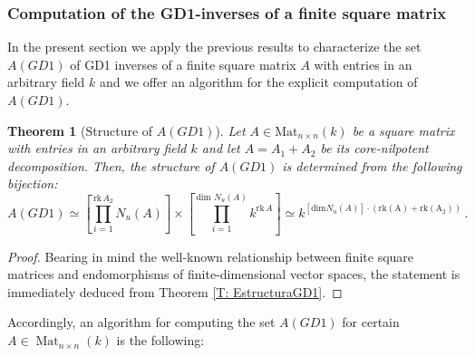 \documentclass[10pt,a4paper]{amsart}
\newtheorem{thm}[defn]{Theorem}
\theoremstyle{plain}
\theoremstyle{remark}
\numberwithin{equation}{section} \numberwithin{defn}{section}
\newcommand{\Mat}{\operatorname{Mat}}
\begin{document}
\subsubsection{Computation of the GD1-inverses of a finite square matrix}\label{ss: Computation GD1 Matrices}



In the present section we apply the previous results to characterize the set $A(GD1)$ of GD1 inverses of a finite square matrix $A$ with entries in an arbitrary field $k$ and we offer an algorithm for the explicit computation of $A(GD1).$ 

\begin{thm} [Structure of $A(GD1)$] \label{T: Char AGD1 fin} Let $A \in \text{Mat}_{n\times n} (k)$ be a square matrix with entries in an arbitrary field $k$ and let $A = A_1 + A_2$ be its core-nilpotent decomposition. Then, the structure of $A(GD1)$ is determined from the following bijection:
\begin{equation} \label{eq:char AGD1} A(GD1) \simeq  [\prod_{i=1}^{\text{rk} \, A_2} N_u(A)] \times [\prod_{i=1}^{\text{dim } N_u(A)} k^{\text{rk} \, A}]\simeq k^{[\mathrm{dim } N_u(A)]\cdot (\mathrm{rk (A)}+\mathrm{rk (A_2)}) }   \, . \end{equation}
\end{thm}

\begin{proof} Bearing in mind the well-known relationship between finite square matrices and endomorphisms of finite-dimensional vector spaces, the statement is  immediately deduced from Theorem \ref{T: EstructuraGD1}.
\end{proof}

Accordingly, an algorithm for computing the set $A(GD1)$ for certain $A\in \Mat_{n\times n}(k)$ is the following:
\end{document}
